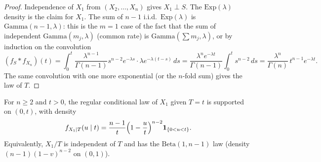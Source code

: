 \documentclass[11pt,a4paper]{article}
\begin{document}
\begin{proof}
Independence of \(X_1\) from \((X_2,\dots,X_n)\) gives \(X_1\perp S\). The \(\mathrm{Exp}(\lambda)\) density is the claim for \(X_1\). The sum of \(n-1\) i.i.d.\ \(\mathrm{Exp}(\lambda)\) is \(\mathrm{Gamma}(n-1,\lambda)\): this is the \(m=1\) case of the fact that the sum of independent \(\mathrm{Gamma}(m_j,\lambda)\) (common rate) is \(\mathrm{Gamma}(\sum m_j,\lambda)\), or by induction on the convolution
\[
(f_S*f_{X_n})(t)
=
\int_0^t\frac{\lambda^{n-1}}{\Gamma(n-1)}s^{n-2}e^{-\lambda s}\cdot\lambda e^{-\lambda(t-s)}\,ds
=
\frac{\lambda^n e^{-\lambda t}}{\Gamma(n-1)}\int_0^t s^{n-2}\,ds
=
\frac{\lambda^n}{\Gamma(n)}\,t^{n-1}e^{-\lambda t}.
\]
The same convolution with one more exponential (or the \(n\)-fold sum) gives the law of \(T\).
\end{proof}

\begin{lemma}
\label{lem:p8-cond}
For \(n\ge 2\) and \(t>0\), the regular conditional law of \(X_1\) given \(T=t\) is supported on \((0,t)\), with density
\[
f_{X_1\mid T}(u\mid t)
=
\frac{n-1}{t}\Bigl(1-\frac{u}{t}\Bigr)^{n-2}
\mathbf{1}_{\{0<u<t\}}.
\]
Equivalently, \(X_1/T\) is independent of \(T\) and has the \(\mathrm{Beta}(1,n-1)\) law (density \((n-1)(1-v)^{n-2}\) on \((0,1)\)).
\end{lemma}
\end{document}
